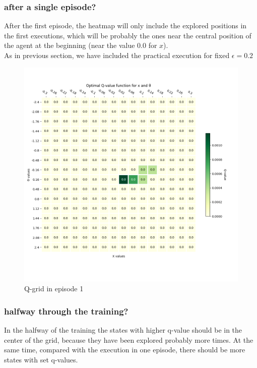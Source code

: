 \documentclass[12pt]{article}
\begin{document}
\subsubsection{after a single episode?}

After the first episode, the heatmap will only include the explored positions in the first executions, which will be probably the ones near the central position of the agent at the beginning (near the value 0.0 for $x$).\\

As in previous section, we have included the practical execution for fixed $\epsilon=0.2$

\begin{figure}[h]
    \centering
    \includegraphics[scale=0.25]{exercise-3/plots/heatmap-fixed-0.2-ep-1.png}
    \caption{Q-grid in episode 1}
    \label{fig:q-1-2}
\end{figure}

\subsubsection{halfway through the training?}

In the halfway of the training the states with higher q-value should be in the center of the grid, because they have been explored probably more times. At the same time, compared with the execution in one episode, there should be more states with set q-values.\\
\end{document}
